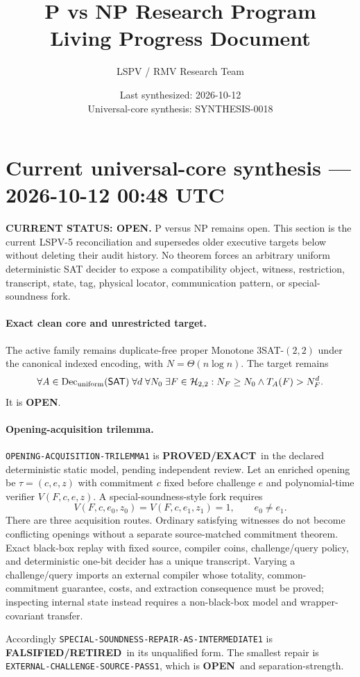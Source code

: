\documentclass[11pt]{article}
\title{\bfseries P vs NP Research Program\\[0.25em]
\Large Living Progress Document}
\author{LSPV / RMV Research Team}
\date{Last synthesized: 2026-10-12\\ Universal-core synthesis: SYNTHESIS-0018}
\newcommand{\statusproved}{\textcolor{proved}{\textbf{PROVED/EXACT}}}
\newcommand{\statusopen}{\textcolor{openstatus}{\textbf{OPEN}}}
\newcommand{\statusretired}{\textcolor{retired}{\textbf{FALSIFIED/RETIRED}}}
\begin{document}
\section{Current universal-core synthesis --- 2026-10-12 00:48 UTC}

\begin{statusbox}
\textbf{CURRENT STATUS: OPEN.} P versus NP remains open. This section is the
current LSPV-5 reconciliation and supersedes older executive targets below
without deleting their audit history. No theorem forces an arbitrary uniform
deterministic SAT decider to expose a compatibility object, witness,
restriction, transcript, state, tag, physical locator, communication pattern,
or special-soundness fork.
\end{statusbox}

\paragraph{Exact clean core and unrestricted target.}
The active family remains duplicate-free proper Monotone $3$SAT-$(2,2)$ under
the canonical indexed encoding, with $N=\Theta(n\log n)$. The target remains
\[
 \forall A\in\operatorname{Dec}_{\rm uniform}(\mathsf{SAT})\;
 \forall d\;\forall N_0\;\exists F\in\mathcal H_{2,2}:
 N_F\ge N_0\land T_A(F)>N_F^d.
\]
It is \statusopen.

\paragraph{Opening-acquisition trilemma.}
\texttt{OPENING-ACQUISITION-TRILEMMA1} is \statusproved\ in the declared
deterministic static model, pending independent review.  Let an enriched
opening be $\tau=(c,e,z)$ with commitment $c$ fixed before challenge $e$ and
polynomial-time verifier $V(F,c,e,z)$.  A special-soundness-style fork requires
\[
 V(F,c,e_0,z_0)=V(F,c,e_1,z_1)=1,\qquad e_0\ne e_1.
\]
There are three acquisition routes.  Ordinary satisfying witnesses do not
become conflicting openings without a separate source-matched commitment
theorem.  Exact black-box replay with fixed source, compiler coins,
challenge/query policy, and deterministic one-bit decider has a unique
transcript.  Varying a challenge/query imports an external compiler whose
totality, common-commitment guarantee, costs, and extraction consequence must
be proved; inspecting internal state instead requires a non-black-box model
and wrapper-covariant transfer.

Accordingly \texttt{SPECIAL-SOUNDNESS-REPAIR-AS-INTERMEDIATE1} is
\statusretired\ in its unqualified form.  The smallest repair is
\texttt{EXTERNAL-CHALLENGE-SOURCE-PASS1}, which is \statusopen\ and
separation-strength.
\end{document}
